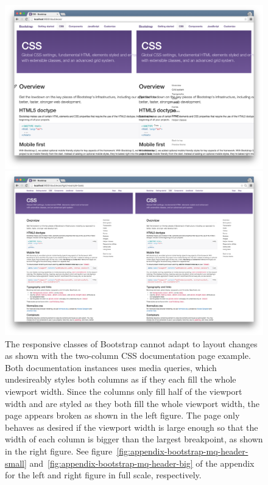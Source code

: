 \documentclass[a4paper,11pt]{kth-mag}
\begin{document}
      \begin{figure}[htbp]
        \centering
        \begin{minipage}{.5\textwidth}
          \centering
          \includegraphics[width=\linewidth]{images/bootstrap-mq-header-small}
        \end{minipage}%
        \begin{minipage}{.5\textwidth}
          \centering
          \includegraphics[width=\linewidth]{images/bootstrap-mq-header-big}
        \end{minipage}
        \caption{
          The \gls{responsive} classes of \gls{Bootstrap} cannot adapt to layout changes as shown with the two-column \gls{CSS} documentation page example.
          Both documentation instances uses \gls{media queries}, which undesireably styles both columns as if they each fill the whole \gls{viewport} width.
          Since the columns only fill half of the \gls{viewport} width and are styled as they both fill the whole \gls{viewport} width, the page appears broken as shown in the left figure.
          The page only behaves as desired if the \gls{viewport} width is large enough so that the width of each column is bigger than the largest  breakpoint, as shown in the right figure.
          See figure~\ref{fig:appendix-bootstrap-mq-header-small} and~\ref{fig:appendix-bootstrap-mq-header-big} of the appendix for the left and right figure in full scale, respectively.}
        \label{fig:eval-bootstrap-mq-broken}
      \end{figure}
\end{document}

